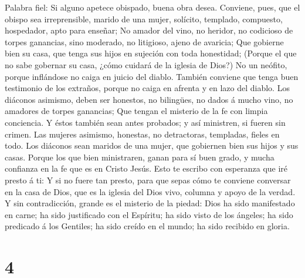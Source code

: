  Palabra fiel: Si alguno apetece obispado, buena obra desea.
 Conviene, pues, que el obispo sea irreprensible, marido de
una mujer, solícito, templado, compuesto, hospedador, apto para enseñar;
 No amador del vino, no heridor, no codicioso de torpes
ganancias, sino moderado, no litigioso, ajeno de avaricia; 
Que gobierne bien su casa, que tenga sus hijos en sujeción con toda
honestidad;  (Porque el que no sabe gobernar su casa, ¿cómo
cuidará de la iglesia de Dios?)  No un neófito, porque
inflándose no caiga en juicio del diablo.  También conviene
que tenga buen testimonio de los extraños, porque no caiga en afrenta y
en lazo del diablo.  Los diáconos asimismo, deben ser
honestos, no bilingües, no dados á mucho vino, no amadores de torpes
ganancias;  Que tengan el misterio de la fe con limpia
conciencia.  Y éstos también sean antes probados; y así
ministren, si fueren sin crimen.  Las mujeres asimismo,
honestas, no detractoras, templadas, fieles en todo.  Los
diáconos sean maridos de una mujer, que gobiernen bien sus hijos y sus
casas.  Porque los que bien ministraren, ganan para sí buen
grado, y mucha confianza en la fe que es en Cristo Jesús. 
Esto te escribo con esperanza que iré presto á ti:  Y si no
fuere tan presto, para que sepas cómo te conviene conversar en la casa
de Dios, que es la iglesia del Dios vivo, columna y apoyo de la verdad.
 Y sin contradicción, grande es el misterio de la piedad:
Dios ha sido manifestado en carne; ha sido justificado con el Espíritu;
ha sido visto de los ángeles; ha sido predicado á los Gentiles; ha sido
creído en el mundo; ha sido recibido en gloria.

\hypertarget{section-3}{%
\section{4}\label{section-3}}


